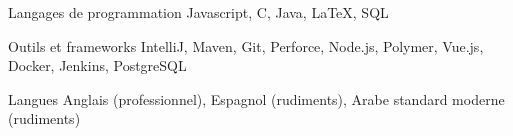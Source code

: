 
\begin{cvskills}

\cvskill
{Langages de programmation}
{Javascript, C, Java, LaTeX, SQL}

\cvskill
{Outils et frameworks}
{IntelliJ, Maven, Git, Perforce, Node.js, Polymer, Vue.js, Docker, Jenkins, PostgreSQL}

\cvskill
{Langues}
{Anglais (professionnel), Espagnol (rudiments), Arabe standard moderne (rudiments)}


\end{cvskills}
